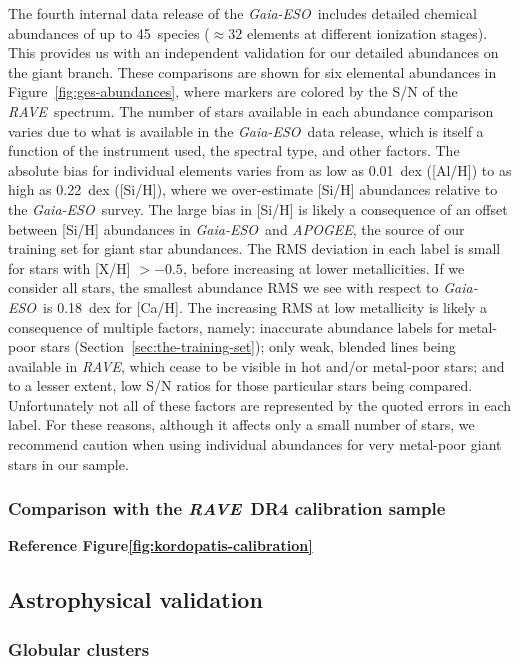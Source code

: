 \documentclass[preprint,trackchanges]{aastex}
\newcommand{\acronym}[1]{{\small{#1}}}
\newcommand{\project}[1]{\textsl{#1}}
\newcommand{\rave}{\project{\acronym{RAVE}}}
\newcommand{\ges}{\project{Gaia-ESO}}
\newcommand{\apogee}{\project{\acronym{APOGEE}}}
\newcommand{\stub}[1]{{\color{blue} \textbf{#1}}}
\begin{document}
The fourth internal data release of the \ges\ includes detailed chemical
abundances of up to 45~species ($\approx32$ elements at different ionization
stages).  This provides us with an independent validation for our detailed
abundances on the giant branch.  These comparisons are shown for six elemental
abundances in Figure~\ref{fig:ges-abundances}, where markers are colored by the
S/N of the \rave\ spectrum.  The number of stars available in each abundance
comparison varies due to what is available in the \ges\ data release, which
is itself a function of the instrument used, the spectral type, and other
factors.  The absolute bias for individual elements varies from as low as
0.01~dex ([Al/H]) to as high as 0.22~dex ([Si/H]), where we over-estimate 
[Si/H] abundances relative to the \ges\ survey.  The large bias in [Si/H]
is likely a consequence of an offset between [Si/H] abundances in \ges\ and
\apogee, the source of our training set for giant star abundances.  
The RMS deviation in each
label is small for stars with [X/H] $> -0.5$, before increasing at lower
metallicities.  If we consider all stars, the smallest abundance RMS we see
with respect to \ges\ is 0.18~dex for [Ca/H].  The increasing RMS at low 
metallicity is likely a consequence of multiple factors, namely: inaccurate
abundance labels for metal-poor stars (Section~\ref{sec:the-training-set});
only weak, blended lines being available in \rave, which cease to be visible
in hot and/or metal-poor stars; and to a lesser extent, low S/N ratios for 
those particular stars being compared.  Unfortunately not all of these
factors are represented by the quoted errors in each label.  For these reasons, 
although it affects only a small number of stars, we recommend caution when 
using individual abundances for very metal-poor giant stars in our sample.


\subsubsection{Comparison with the \rave\ DR4 calibration sample}


\stub{Reference Figure\ref{fig:kordopatis-calibration}}



\subsection{Astrophysical validation}
\label{sec:astrophysical-validation}

\subsubsection{Globular clusters}
\label{sec:globular-cluster-validation}
\end{document}
